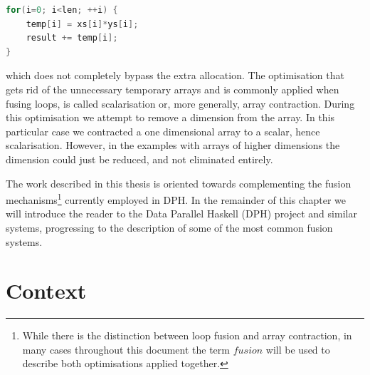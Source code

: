 \documentclass[preamble.tex]{subfiles}
\begin{document}
\begin{lstlisting}[basicstyle={\ttfamily},language=C,tabsize=4]
for(i=0; i<len; ++i) {
	temp[i] = xs[i]*ys[i];
	result += temp[i];
}
\end{lstlisting}


which does not completely bypass the extra allocation. The optimisation that gets rid of the unnecessary temporary arrays and is commonly applied when fusing loops, is called scalarisation or, more generally, array contraction. During this optimisation we attempt to remove a dimension from the array. In this particular case we contracted a one dimensional array to a scalar, hence scalarisation. However, in the examples with arrays of higher dimensions the dimension could just be reduced, and not eliminated entirely.

The work described in this thesis is oriented towards complementing the fusion mechanisms\footnote{While there is the distinction between loop fusion and array contraction, in many cases throughout this document the term $fusion$ will be used to describe both optimisations applied together.} currently employed in DPH. In the remainder of this chapter we will introduce the reader to the Data Parallel Haskell (DPH) project and similar systems, progressing to the description of some of the most common fusion systems.

\pagebreak{}


\section{\label{sec:Lit:DPH}Context}
\end{document}
